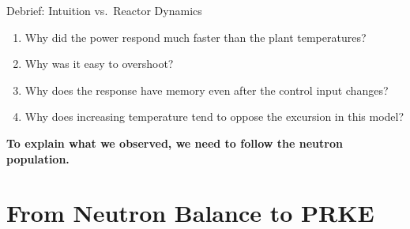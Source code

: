 \documentclass[aspectratio=169]{beamer}
\begin{document}
\begin{frame}{Debrief: Intuition vs.\ Reactor Dynamics}

    \begin{enumerate}

        \item Why did the power respond much faster than the plant temperatures?

        \item Why was it easy to overshoot?

        \item Why does the response have memory even after the control input
              changes?

        \item Why does increasing temperature tend to oppose the excursion
              in this model?

    \end{enumerate}

    \vspace{1em}

    \begin{center}

        \textbf{
            To explain what we observed, we need to follow the neutron
            population.
        }

    \end{center}

\end{frame}



\section{From Neutron Balance to PRKE}


\end{document}
